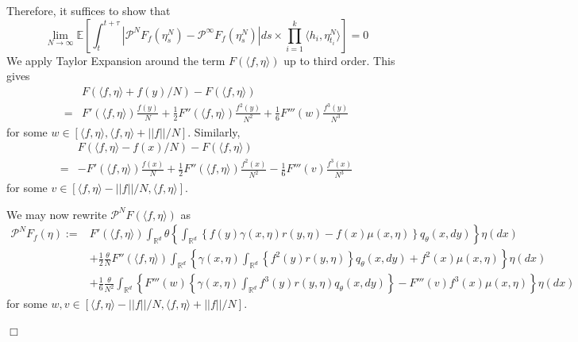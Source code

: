 \documentclass[12pt]{article}
\newenvironment {proof}{{\noindent\bf Proof }}{\hfill $\Box$ \medskip}
\newcommand{\IR}{\mathbb R}
\newcommand{\Pgen}{\mathcal{P}}    %
\begin{document}
\begin{proof}
Therefore, it suffices to show that 
\begin{equation}
    \label{eq: Convergence of Spatial Generator}
\lim_{N \to \infty}
\mathbb{E}\left[
\int_{t}^{t+\tau}
\left|
\Pgen^{N}F_f(\eta^{N}_s)
-\Pgen^{\infty}F_f(\eta^{N}_s)
\right|
ds
\times 
\prod_{i=1}^{k}\langle h_i,\eta^{N}_{t_i} \rangle
\right]=0
\end{equation}
We apply Taylor Expansion
around the term $F(\langle f, \eta \rangle )$
up to third order.
This gives
\begin{equation}
    \label{eq: Taylor Expansion calculations i}
\begin{aligned}
&F(\langle f, \eta \rangle + f(y)/N )-F(\langle f, \eta \rangle )\\
=& F'(\langle f, \eta \rangle ) \frac{f(y)}{N}
+\frac{1}{2}F''(\langle f, \eta \rangle ) \frac{f^2(y)}{N^2}
+\frac{1}{6}F'''(w ) \frac{f^3(y)}{N^3}
\end{aligned}
\end{equation}
for some $w \in [\langle f, \eta \rangle, \langle f, \eta \rangle+ ||f||/N]$.
Similarly,
\begin{equation}
    \label{eq: Taylor Expansion calculations ii}
\begin{aligned}
&F(\langle f, \eta \rangle - f(x)/N )-F(\langle f, \eta \rangle )\\
=& - F'(\langle f, \eta \rangle ) \frac{f(x)}{N}
+\frac{1}{2}F''(\langle f, \eta \rangle ) \frac{f^2(x)}{N^2}
-\frac{1}{6}F'''(v ) \frac{f^3(x)}{N^3}
\end{aligned}
\end{equation}
for some $v \in [\langle f, \eta \rangle - ||f||/N, \langle f, \eta \rangle ]$.

We may now rewrite $\mathcal{P}^NF(\langle f, \eta \rangle)$ as 
\small
\begin{equation} 
    \label{eq: Pre-Limit Generator Expanded}
\begin{aligned}
\Pgen^{N} F_f(\eta):=& F'(\langle f, \eta \rangle)\int_{\IR^d}  \theta\left\{\int_{\IR^d} \left\{f(y)\gamma(x, \eta) r(y,\eta) -f(x)\mu(x, \eta)\right\}q_{\theta}(x,dy)\right\}\eta(dx)\\
&+\frac{1}{2}\frac{\theta}{N}F''(\langle f, \eta \rangle)\int_{\IR^d} 
 \left\{\gamma(x, \eta)\int_{\IR^d} \left\{f^2(y) r(y,\eta) \right\}q_{\theta}(x,dy)+f^2(x)\mu(x, \eta)\right\}\eta(dx)\\
&+\frac{1}{6}\frac{\theta}{N^2}\int_{\IR^d}\left\{ 
F'''(w) \left\{\gamma(x, \eta)\int_{\IR^d} f^3(y) r(y,\eta) q_{\theta}(x,dy)\right\}-F'''(v)f^3(x)\mu(x, \eta)\right\}\eta(dx)
\end{aligned}    
\end{equation}
\normalsize
for some $w,v \in [\langle f,\eta \rangle - ||f||/N, \langle f,\eta \rangle + ||f||/N]$.


\end{proof}
\end{document}
